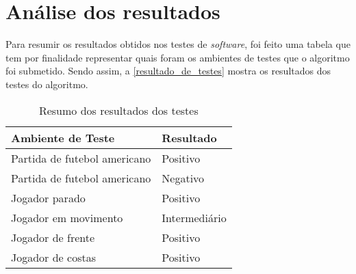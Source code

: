 \section{\textbf{Análise dos resultados}}

Para resumir os resultados obtidos nos testes de \textit{software}, foi feito uma tabela que tem por finalidade representar quais foram os ambientes de testes que o algoritmo foi submetido. Sendo assim, a \autoref{resultado_de_testes} mostra os resultados dos testes do algoritmo.

\begin{table}[h]
\centering
\caption{Resumo dos resultados dos testes}
\label{resultado_de_testes}
\begin{tabular}{l|l} 
\hline
\hline
\multicolumn{1}{l|}{Ambiente de Teste} & \multicolumn{1}{l}{Resultado}  \\ 
\hline
Partida de futebol americano & Positivo\\
Partida de futebol americano & Negativo\\
Jogador parado & Positivo\\
Jogador em movimento & Intermediário\\
Jogador de frente & Positivo\\
Jogador de costas & Positivo\\
\hline
\hline 
\end{tabular}
\end{table}